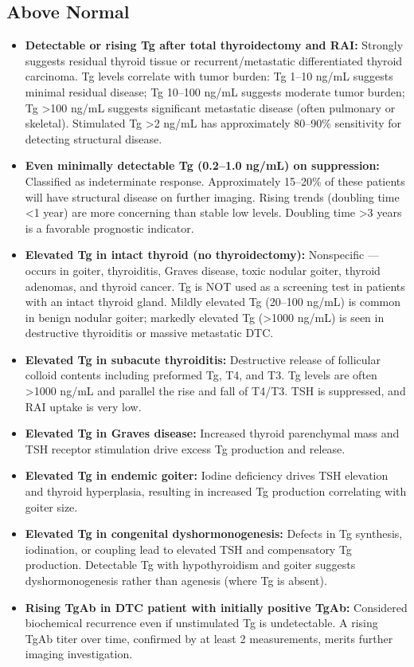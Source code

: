 \subsection*{Above Normal}
\begin{itemize}
  \item \textbf{Detectable or rising Tg after total thyroidectomy and RAI:} Strongly suggests residual thyroid tissue or recurrent/metastatic differentiated thyroid carcinoma. Tg levels correlate with tumor burden: Tg 1--10 ng/mL suggests minimal residual disease; Tg 10--100 ng/mL suggests moderate tumor burden; Tg >100 ng/mL suggests significant metastatic disease (often pulmonary or skeletal). Stimulated Tg >2 ng/mL has approximately 80--90\% sensitivity for detecting structural disease.
  \item \textbf{Even minimally detectable Tg (0.2--1.0 ng/mL) on suppression:} Classified as indeterminate response. Approximately 15--20\% of these patients will have structural disease on further imaging. Rising trends (doubling time <1 year) are more concerning than stable low levels. Doubling time >3 years is a favorable prognostic indicator.
  \item \textbf{Elevated Tg in intact thyroid (no thyroidectomy):} Nonspecific --- occurs in goiter, thyroiditis, Graves disease, toxic nodular goiter, thyroid adenomas, and thyroid cancer. Tg is NOT used as a screening test in patients with an intact thyroid gland. Mildly elevated Tg (20--100 ng/mL) is common in benign nodular goiter; markedly elevated Tg (>1000 ng/mL) is seen in destructive thyroiditis or massive metastatic DTC.
  \item \textbf{Elevated Tg in subacute thyroiditis:} Destructive release of follicular colloid contents including preformed Tg, T4, and T3. Tg levels are often >1000 ng/mL and parallel the rise and fall of T4/T3. TSH is suppressed, and RAI uptake is very low.
  \item \textbf{Elevated Tg in Graves disease:} Increased thyroid parenchymal mass and TSH receptor stimulation drive excess Tg production and release.
  \item \textbf{Elevated Tg in endemic goiter:} Iodine deficiency drives TSH elevation and thyroid hyperplasia, resulting in increased Tg production correlating with goiter size.
  \item \textbf{Elevated Tg in congenital dyshormonogenesis:} Defects in Tg synthesis, iodination, or coupling lead to elevated TSH and compensatory Tg production. Detectable Tg with hypothyroidism and goiter suggests dyshormonogenesis rather than agenesis (where Tg is absent).
  \item \textbf{Rising TgAb in DTC patient with initially positive TgAb:} Considered biochemical recurrence even if unstimulated Tg is undetectable. A rising TgAb titer over time, confirmed by at least 2 measurements, merits further imaging investigation.
\end{itemize}

